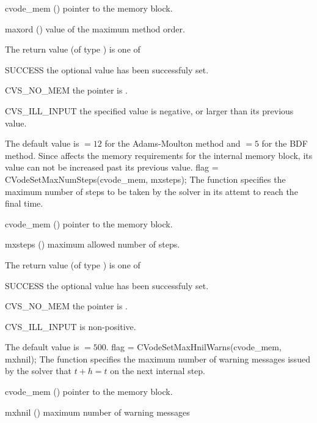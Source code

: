 {
  \begin{args}
  \item[cvode\_mem] ()
    pointer to the {\cvodes} memory block.
  \item[maxord] ()
    value of the maximum method order.
  \end{args}
}
{
  The return value  (of type ) is one of
  \begin{args}
  \item[SUCCESS] 
    the optional value has been successfuly set.
  \item[CVS\_NO\_MEM]
    the  pointer is .
  \item[CVS\_ILL\_INPUT]
    the specified value  is negative, or larger than 
    its previous value.
  \end{args}
}
{
  The default value is $= 12$ for
  the Adams-Moulton method and $= 5$
  for the BDF method.
  Since  affects the memory requirements
  for the internal {\cvodes} memory block, its value
  can not be increased past its previous value.
}
{
flag = CVodeSetMaxNumSteps(cvode\_mem, mxsteps);
}
{
  The function  specifies the maximum number
  of steps to be taken by the solver in its attemt to reach 
  the final time.
}
{
  \begin{args}
  \item[cvode\_mem] ()
    pointer to the {\cvodes} memory block.
  \item[mxsteps] ()
    maximum allowed number of steps.
  \end{args}
}
{
  The return value  (of type ) is one of
  \begin{args}
  \item[SUCCESS] 
    the optional value has been successfuly set.
  \item[CVS\_NO\_MEM]
    the  pointer is .
  \item[CVS\_ILL\_INPUT]
     is non-positive.
  \end{args}
}
{
  The default value is $= 500$.
}
{
flag = CVodeSetMaxHnilWarns(cvode\_mem, mxhnil);
}
{
  The function  specifies the maximum number of warning messages
  issued by the solver that $t+h=t$ on the next internal step.
}
{
  \begin{args}
  \item[cvode\_mem] ()
    pointer to the {\cvodes} memory block.
  \item[mxhnil] ()
    maximum number of warning messages
  \end{args}
}
